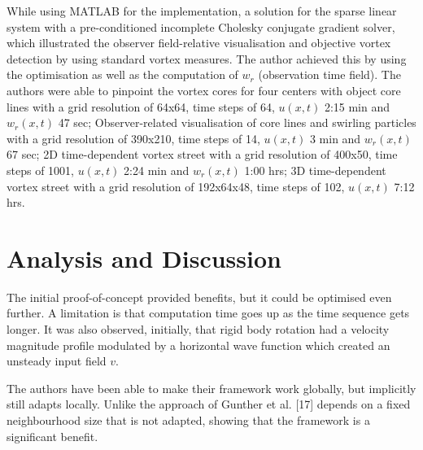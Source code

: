 \documentclass[a4paper,9pt]{article}
\begin{document}
While using MATLAB for the implementation,  a solution for the sparse linear system with a pre-conditioned incomplete Cholesky conjugate gradient solver, which illustrated the observer field-relative visualisation and objective vortex detection by using standard vortex measures. The author achieved this by using the optimisation as well as the computation of $w_r$ (observation time field). The authors were able to pinpoint the vortex cores for four centers with object core lines with a grid resolution of 64x64, time steps of 64, $u(x,t)$ 2:15 min and $w_r(x,t)$ 47 sec; Observer-related visualisation of core lines and swirling particles with a grid resolution of 390x210, time steps of 14, $u(x,t)$ 3 min and $w_r(x,t)$ 67 sec; 2D time-dependent vortex street with a grid resolution of 400x50, time steps of 1001, $u(x,t)$ 2:24 min and $w_r(x,t)$ 1:00 hrs; 3D time-dependent vortex street with a grid resolution of 192x64x48, time steps of 102, $u(x,t)$ 7:12 hrs.

\section{Analysis and Discussion}

The initial proof-of-concept provided benefits, but it could be optimised even further. A limitation is that computation time goes up as the time sequence gets longer. It was also observed, initially, that rigid body rotation had a velocity magnitude profile modulated by a horizontal wave function which created an unsteady input field $v$.

The authors have been able to make their framework work globally, but implicitly still adapts locally. Unlike the approach of Gunther et al. [17] depends on a fixed neighbourhood size that is not adapted, showing that the framework is a significant benefit.



\medskip
\newpage


\end{document}
